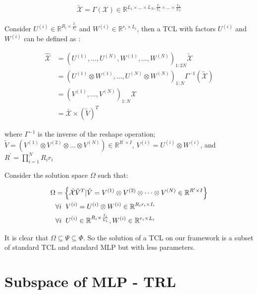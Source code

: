 \documentclass{article}
\begin{document}
\begin{align}
	\label{eq:subspace-tcl-49}
	\tilde{\mathcal{X}} = \Gamma (\mathcal{X}) \in \mathbb{R}^{L_1\times\dots\times L_N,\frac{I_1}{L_1}\times\dots\times \frac{I_N}{L_N}}
\end{align}

Consider $U^{(i)} \in \mathbb{R}^{R_i\times \frac{I_i}{L_i}}$ and $W^{(i)} \in \mathbb{R}^{r_i\times L_i}$, then a TCL with factors $U^{(i)}$ and $W^{(i)}$ can be defined as :

\begin{align}
	\label{eq:subspace-tcl-50}
	\hat{\mathcal{X}} &= \left(U^{(1)},\dots,U^{(N)}, W^{(1)},\dots,W^{(N)}\right)_{1:2N} \tilde{\mathcal{X}}
	\nonumber \\
	& = \left(U^{(1)} \otimes W^{(1)} ,\dots,U^{(N)} \otimes W^{(N)}\right)_{1:N} \Gamma^{-1}(\tilde{\mathcal{X}})
	\nonumber\\
	& = \left(V^{(1)} ,\dots,V^{(N)}\right)_{1:N} \mathcal{X}
	\nonumber\\
	&= \bar{\mathcal{X}} \times (\tilde{V})^T 
\end{align}

where $\Gamma^{-1}$ is the inverse of the reshape operation; $\tilde{V} = \left(V^{(1)}\otimes V^{(2)}\otimes \dots\otimes V^{(N)} \right) \in \mathbb{R}^{R^\prime\times I}$, $V^{(i)} = U^{(i)} \otimes W^{(i)}$, and $R^\prime = \prod_{i=1}^{N} R_i r_i$


Consider the solution space $\Omega$ such that:

\begin{align}
	\label{eq:subspace-tcl-51}
	\Omega &= \left\{
	\bar{\mathcal{X}} \tilde{V}^T | 
	\tilde{V} = V^{(1)}\otimes V^{(2)}\otimes \dots\otimes V^{(N)}  \in \mathbb{R}^{R^\prime\times I} \right\}
	\nonumber \\
	 &\forall i \hspace{2mm} V^{(i)} = U^{(i)} \otimes W^{(i)} \in \mathbb{R}^{R_ir_i\times I_i} 
	 \nonumber \\
	 &\forall i \hspace{2mm} U^{(i)} \in \mathbb{R}^{R_i \times \frac{I_i}{L_i}}, W^{(i)} \in \mathbb{R}^{r_i\times L_i}
\end{align}


It is clear that $\Omega \subseteq \Psi \subseteq \Phi$. So the solution of a TCL on our framework is a subset of standard TCL and standard MLP but with less parameters. 


\section{Subspace of MLP - TRL}
\label{subspace-trl}
\end{document}
